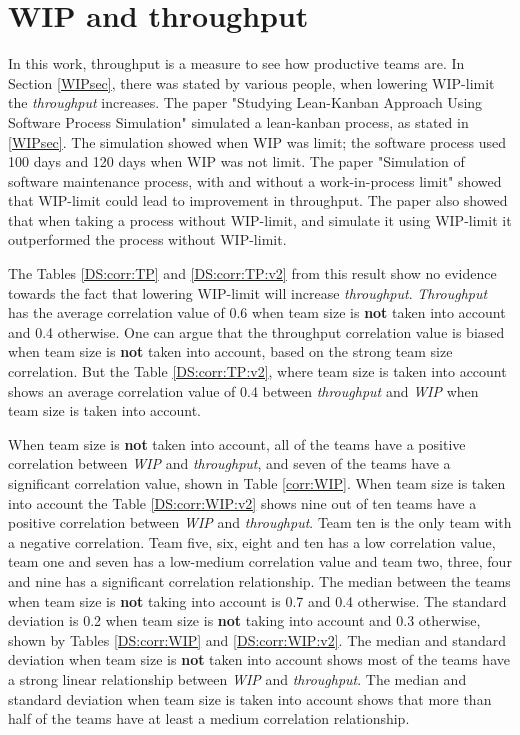 \documentclass[UKenglish]{ifimaster}  %
\begin{document}
\section{WIP and throughput} 
\vspace{-0.5em}
In this work, throughput is a measure to see how productive teams are. In Section \ref{WIPsec}, there was stated by various people, when lowering WIP-limit the \textit{throughput} increases. The paper "Studying Lean-Kanban Approach Using Software Process Simulation" \parencite{DavidAnderson} simulated a  lean-kanban process, as stated in \ref{WIPsec}. The simulation showed when WIP was limit; the software process used 100 days and 120 days when WIP was not limit. The paper "Simulation of software maintenance process, with and without a work-in-process limit" \parencite{SMR:SMR1599} showed that WIP-limit could lead to improvement in throughput. The paper also showed that when taking a process without WIP-limit, and simulate it using WIP-limit it outperformed the process without WIP-limit.


The Tables \ref{DS:corr:TP} and \ref{DS:corr:TP:v2} from this result show no evidence towards the fact that lowering WIP-limit will increase \textit{throughput}. \textit{Throughput} has the average correlation value of 0.6 when team size is \textbf{not} taken into account and 0.4 otherwise. One can argue that the throughput correlation value is biased when team size is \textbf{not} taken into account, based on the strong team size correlation. But the Table \ref{DS:corr:TP:v2}, where team size is taken into account shows an average correlation value of 0.4 between \textit{throughput} and \textit{WIP} when team size is taken into account.

When team size is \textbf{not} taken into account,  all of the teams have a positive correlation between \textit{WIP} and \textit{throughput}, and seven of the teams have a significant correlation value, shown in Table \ref{corr:WIP}.  When team size is taken into account the Table \ref{DS:corr:WIP:v2}  shows nine out of ten teams have a positive correlation between \textit{WIP} and \textit{throughput}. Team ten is the only team with a negative correlation.  Team five, six, eight and ten has a low correlation value, team one and seven has a low-medium correlation value and team two, three, four and nine has a significant correlation relationship. The median between the teams when team size is \textbf{not} taking into account is 0.7 and 0.4 otherwise. The standard deviation is 0.2 when team size is \textbf{not} taking into account and 0.3 otherwise, shown by Tables \ref{DS:corr:WIP} and \ref{DS:corr:WIP:v2}. The median and standard deviation when team size is \textbf{not} taken into account shows most of the teams have a strong linear relationship between \textit{WIP} and \textit{throughput}. The median and standard deviation when team size is taken into account shows that more than half of the teams have at least  a medium correlation relationship.
\end{document}
